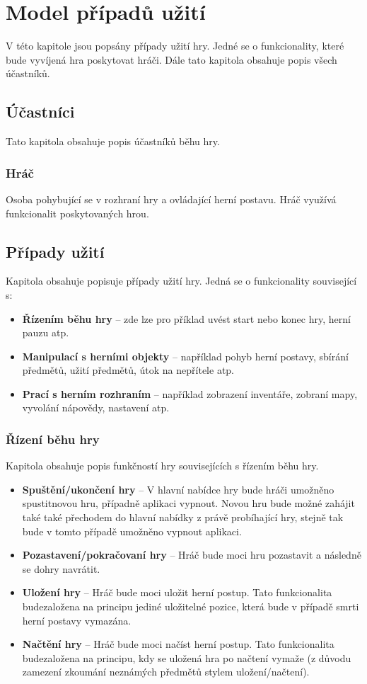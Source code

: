 \documentclass[12pt,a4paper]{article}
\begin{document}
\section{Model případů užití}
V této kapitole jsou popsány případy užití hry. Jedné se o funkcionality, které
bude vyvíjená hra poskytovat hráči. Dále tato kapitola obsahuje popis všech
účastníků.

\subsection{Účastníci}
Tato kapitola obsahuje popis účastníků běhu hry.

\subsubsection{Hráč}
Osoba pohybující se v rozhraní hry a ovládající herní postavu. Hráč využívá
funkcionalit poskytovaných hrou.

\subsection{Případy užití}
Kapitola obsahuje popisuje případy užití hry. Jedná se o funkcionality související s:
\begin{itemize}
  \item{\textbf{Řízením běhu hry} -- zde lze pro příklad uvést start nebo konec hry, herní
    pauzu atp.}
  \item{\textbf{Manipulací s herními objekty} -- například pohyb herní postavy, sbírání
    předmětů, užití předmětů, útok na nepřítele atp.}
  \item{\textbf{Prací s herním rozhraním} -- například zobrazení inventáře, zobraní mapy,
    vyvolání nápovědy, nastavení atp.}
\end{itemize}

\subsubsection{Řízení běhu hry}

Kapitola obsahuje popis funkčností hry souvisejících s řízením běhu hry.

\begin {itemize}
\item{\textbf{Spuštění/ukončení hry} --  V hlavní nabídce hry bude hráči
  umožněno spustitnovou hru, případně aplikaci vypnout. Novou hru bude možné
  zahájit také také přechodem do hlavní nabídky z právě probíhající hry, stejně
  tak bude v tomto případě umožněno vypnout aplikaci.}
\item{\textbf{Pozastavení/pokračovaní hry} --  Hráč bude moci hru pozastavit a
  následně se dohry navrátit.}
\item{\textbf{Uložení hry} --  Hráč bude moci uložit herní postup. Tato
  funkcionalita budezaložena na principu jediné uložitelné pozice, která bude v
  případě smrti herní postavy vymazána.}
\item{\textbf{Načtění hry} --  Hráč bude moci načíst herní postup. Tato
  funkcionalita budezaložena na principu, kdy se uložená hra po načtení vymaže
  (z důvodu zamezení zkoumání neznámých předmětů stylem uložení/načtení).}
\end {itemize}
\end{document}
